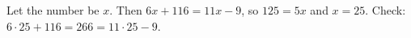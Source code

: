 Let the number be $x$. Then $6x+116=11x-9$, so $125=5x$ and $x=\boxed{25}$. Check: $6\cdot25+116=266=11\cdot25-9$.
